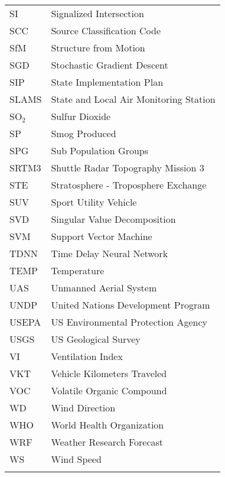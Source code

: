 \begin{longtable}{ll}
SI & Signalized Intersection \\
SCC & Source Classification Code \\
SfM & Structure from Motion \\
SGD & Stochastic Gradient Descent \\
SIP & State Implementation Plan \\
SLAMS & State and Local Air Monitoring Station \\
SO$_{2}$ & Sulfur Dioxide \\
SP & Smog Produced \\
SPG & Sub Population Groups \\
SRTM3 & Shuttle Radar Topography Mission 3 \\
STE & Stratosphere - Troposphere Exchange \\
SUV & Sport Utility Vehicle \\
SVD & Singular Value Decomposition \\
SVM & Support Vector Machine \\
TDNN & Time Delay Neural Network \\
TEMP & Temperature \\
UAS & Unmanned Aerial System \\
UNDP & United Nations Development Program \\
USEPA & US Environmental Protection Agency \\
USGS & US Geological Survey \\
VI & Ventilation Index \\
VKT & Vehicle Kilometers Traveled \\
VOC & Volatile Organic Compound \\
WD & Wind Direction \\
WHO & World Health Organization \\
WRF & Weather Research Forecast \\
WS & Wind Speed \\
\\ \hline
\end{longtable}

\clearpage

